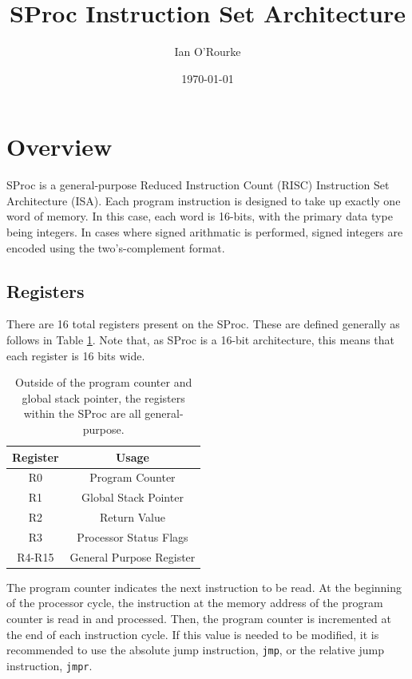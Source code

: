 \documentclass{article}
\title{SProc Instruction Set Architecture}
\author{Ian O'Rourke}
\date{\today \\ \titlelogoimage}
\begin{document}
\maketitle

\section{Overview}

SProc is a general-purpose Reduced Instruction Count (RISC) Instruction Set Architecture (ISA). Each program instruction is designed to take up exactly one word of memory. In this case, each word is 16-bits, with the primary data type being integers. In cases where signed arithmatic is performed, signed integers are encoded using the two's-complement format.

\subsection{Registers}

There are 16 total registers present on the SProc. These are defined generally as follows in Table \ref{table:register-setup}. Note that, as SProc is a 16-bit architecture, this means that each register is 16 bits wide.

\begin{table}[h!]
	\centering
	\begin{tabular}{c|c}
		\hline
		Register & Usage \\
		\hline
		R0 & Program Counter \\
		R1 & Global Stack Pointer \\
		R2 & Return Value \\
		R3 & Processor Status Flags \\
		R4-R15 & General Purpose Register \\
		\hline
	\end{tabular}
	\caption{Outside of the program counter and global stack pointer, the registers within the SProc are all general-purpose.}
	\label{table:register-setup}
\end{table}

The program counter indicates the next instruction to be read. At the beginning of the processor cycle, the instruction at the memory address of the program counter is read in and processed. Then, the program counter is incremented at the end of each instruction cycle. If this value is needed to be modified, it is recommended to use the absolute jump instruction, \texttt{jmp}, or the relative jump instruction, \texttt{jmpr}.
\end{document}
